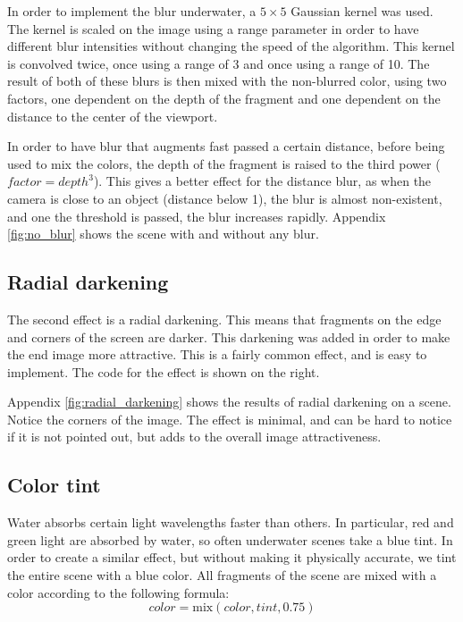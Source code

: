 \documentclass{article}
\begin{document}
\medskip \par
\noindent
In order to implement the blur underwater, a $5\times5$ Gaussian kernel was used. The kernel is scaled on the image using a range parameter in order to have different blur intensities without changing the speed of the algorithm. This kernel is convolved twice, once using a range of 3 and once using a range of 10. The result of both of these blurs is then mixed with the non-blurred color, using two factors, one dependent on the depth of the fragment and one dependent on the distance to the center of the viewport.

\medskip \par
\noindent
In order to have blur that augments fast passed a certain distance, before being used to mix the colors, 
the depth of the fragment is raised to the third power ($factor = depth^3$). 
This gives a better effect for the distance blur, as when the camera is close to an object (distance below 1), 
the blur is almost non-existent, and one the threshold is passed, the blur increases rapidly.
Appendix \ref{fig:no_blur} shows the scene with and without any blur.



\subsection{Radial darkening}
The second effect is a radial darkening. This means that fragments on the edge and corners of the screen are 
darker. This darkening was added in order to make the end image more attractive. 
This is a fairly common effect, and is easy to implement. 
The code for the effect is shown on the right.
\medskip



\medskip \par
\noindent
Appendix \ref{fig:radial_darkening} shows the results of radial darkening on a scene. Notice the corners of the image. The effect is minimal, and can be hard to notice if it is not pointed out, but adds to the overall image attractiveness.

\subsection{Color tint}
Water absorbs certain light wavelengths faster than others. In particular, red and green light are absorbed by water, so often underwater scenes take a blue tint. In order to create a similar effect, but without making it physically accurate, we tint the entire scene with a blue color.
All fragments of the scene are mixed with a color according to the following formula:
\[ color = \text{mix}\left(color, tint, 0.75\right)\]
\end{document}
